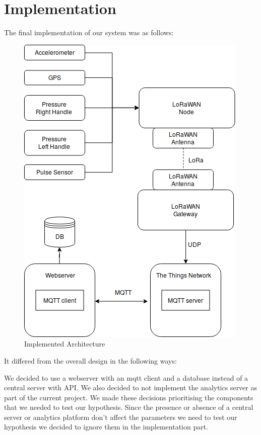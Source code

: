 \chapter{Implementation}
\label{cha:implementation}

The final implementation of our system was as follows:
\begin{figure}[h]
\centering
\includegraphics[width=1\linewidth]{gfx/architecture_implementation_h}
\caption[]{Implemented Architecture}
\label{fig:image2}
\end{figure}

It differed from the overall design in the following ways:

We decided to use a webserver with an mqtt client and a database instead of a central server with API. We also decided to not implement the analytics server as part of the current project. We made these decisions prioritising the components that we needed to test our hypothesis. Since the presence or absence of a central server or analytics platform don't affect the parameters we need to test our hypothesis we decided to ignore them in the implementation part.


